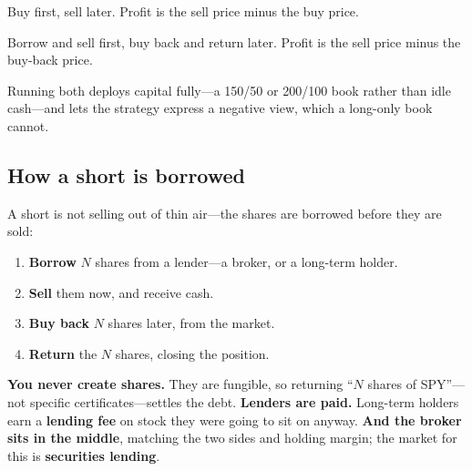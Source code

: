 \begin{definition}[Long]\label{def:long}
Buy first, sell later. Profit is the sell price minus the buy price.
\end{definition}

\begin{definition}[Short]\label{def:short}
Borrow and sell first, buy back and return later. Profit is the sell price minus the buy-back price.
\end{definition}

\begin{note}
Running both deploys capital fully---a 150/50 or 200/100 book rather than idle cash---and lets the
strategy express a negative view, which a long-only book cannot.
\end{note}

\subsection{How a short is borrowed}\label{sec:how-a-short-is-borrowed}

A short is not selling out of thin air---the shares are borrowed before they are sold:

\begin{enumerate}
  \item \textbf{Borrow} $N$ shares from a lender---a broker, or a long-term holder.
  \item \textbf{Sell} them now, and receive cash.
  \item \textbf{Buy back} $N$ shares later, from the market.
  \item \textbf{Return} the $N$ shares, closing the position.
\end{enumerate}

\begin{note}
\textbf{You never create shares.} They are fungible, so returning ``$N$ shares of SPY''---not
specific certificates---settles the debt. \textbf{Lenders are paid.} Long-term holders earn a
\textbf{lending fee} on stock they were going to sit on anyway. \textbf{And the broker sits in the
middle}, matching the two sides and holding margin; the market for this is \textbf{securities
lending}.
\end{note}


